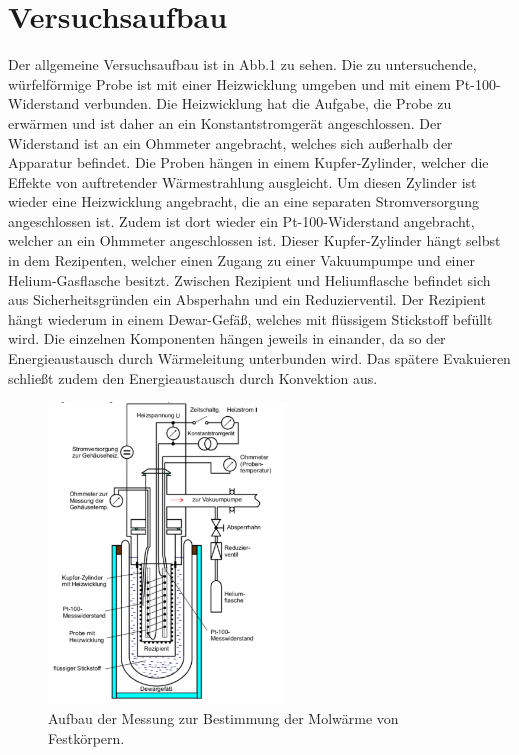 \newpage

\section{Versuchsaufbau}
Der allgemeine Versuchsaufbau ist in Abb.1 zu sehen. Die zu untersuchende, würfelförmige
Probe ist mit einer Heizwicklung umgeben und mit einem Pt-100-Widerstand verbunden. Die
Heizwicklung hat die Aufgabe, die Probe zu erwärmen und ist daher an ein Konstantstromgerät
angeschlossen. Der Widerstand ist an ein Ohmmeter angebracht, welches sich außerhalb der
Apparatur befindet. Die Proben hängen in einem Kupfer-Zylinder, welcher die Effekte von
auftretender Wärmestrahlung ausgleicht. Um diesen Zylinder ist wieder eine Heizwicklung
angebracht, die an eine separaten Stromversorgung angeschlossen ist. Zudem ist dort wieder
ein Pt-100-Widerstand angebracht, welcher an ein Ohmmeter angeschlossen ist. Dieser
Kupfer-Zylinder hängt selbst in dem Rezipenten, welcher einen
Zugang zu einer Vakuumpumpe und einer Helium-Gasflasche besitzt. Zwischen Rezipient und
Heliumflasche befindet sich aus Sicherheitsgründen ein Absperhahn und ein Reduzierventil.
Der Rezipient hängt wiederum in einem Dewar-Gefäß, welches mit flüssigem Stickstoff befüllt
wird. Die einzelnen Komponenten hängen jeweils in einander, da so der Energieaustausch durch
Wärmeleitung unterbunden wird. Das spätere Evakuieren schließt zudem den Energieaustausch
durch Konvektion aus.
\begin{figure}[h!]
 \centering
 \includegraphics[height=8.0cm]{content/V47.pdf}
 \caption{Aufbau der Messung zur Bestimmung der Molwärme von Festkörpern.}
 \label{fig:Versuchsaufbau1}
\end{figure}
\FloatBarrier

